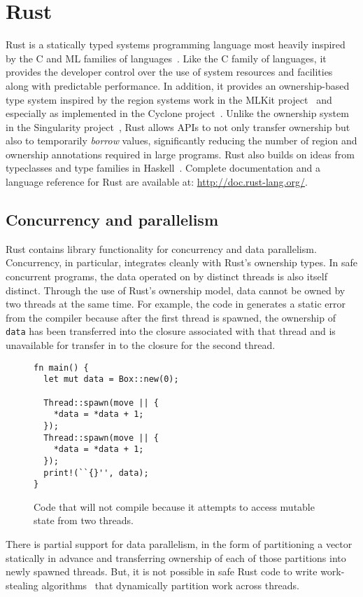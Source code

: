 
\section{Rust}
\label{sec:rust}

Rust is a statically typed systems programming language most heavily inspired by the C
and ML families of languages~\cite{RUST}.
Like the C family of languages, it provides the developer control over the use of system
resources and facilities along with predictable performance.
In addition, it provides an ownership-based type system inspired by the region systems work in the
MLKit project~\cite{mlkit} and especially as implemented in the Cyclone project~\cite{cyclone}.
Unlike the ownership system in the Singularity project~\cite{singularity}, Rust allows APIs to
not only transfer ownership but also to temporarily \emph{borrow} values, significantly
reducing the number of region and ownership annotations required in large programs.
Rust also builds on ideas from typeclasses and type families in Haskell~\cite{haskell}.
Complete documentation and a language reference for Rust are available at: \url{http://doc.rust-lang.org/}.

\subsection{Concurrency and parallelism}
Rust contains library functionality for concurrency and data parallelism.
Concurrency, in particular, integrates cleanly with Rust's ownership types.
In safe concurrent programs, the data operated on by distinct threads is also itself distinct.
Through the use of Rust's ownership model, data cannot be owned by two threads at the same time.
For example, the code in  generates a static error from the compiler because
after the first thread is spawned, the ownership of \lstinline{data} has been transferred into the
closure associated with that thread and is unavailable for transfer in to the closure for the second thread.
\begin{figure}
\begin{lstlisting}
fn main() {
  let mut data = Box::new(0);

  Thread::spawn(move || {
    *data = *data + 1;
  });
  Thread::spawn(move || {
    *data = *data + 1;
  });
  print!(``{}'', data);
}
\end{lstlisting}
  \caption{Code that will not compile because it attempts to access mutable state from two threads.}
  \label{fig:bad-concurrency}
\end{figure}

There is partial support for data parallelism, in the form of partitioning a vector statically in advance
and transferring ownership of each of those partitions into newly spawned threads.
But, it is not possible in safe Rust code to write work-stealing algorithms~\cite{blumeofe:multiprogrammed-work-stealing}
that dynamically partition work across threads.


